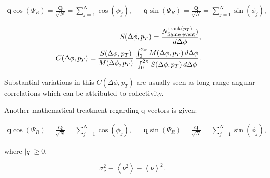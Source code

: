 

\begin{eqnarray}
  \textbf{q} \cos(\Psi_R) = \frac{\textbf{Q}}{\sqrt{N}} = \sum^N_{j=1} \cos(\phi_j), & &
  \textbf{q} \sin(\Psi_R) = \frac{\textbf{Q}}{\sqrt{N}} = \sum^N_{j=1} \sin(\phi_j), 
\end{eqnarray}

\begin{eqnarray}
  S(\Delta\phi,p_{T})=
  \frac{ N^{{\rm track}(p_{T}){\rm }}_{{\rm Same \; event}}) }{ d\Delta\phi}, & &
\label{eq31} \\
  C(\Delta\phi,p_{T}) =
          \frac{S(\Delta\phi,p_{T})}{M(\Delta\phi,p_{T})} \:
          \frac{\int_{0}^{2\pi} M(\Delta\phi,p_{T}) \, d\Delta\phi}{\int_{0}^{2\pi} S(\Delta\phi,p_{T}) \, d\Delta\phi}. & &
  \label{eq:def_corr_function}
\end{eqnarray}

Substantial variations in this $C(\Delta\phi,p_T)$ are usually seen as long-range angular correlations which can be attributed to collectivity.

Another mathematical treatment regarding q-vectors is given: 

\begin{eqnarray}
  \textbf{q} \cos(\Psi_R) = \frac{\textbf{Q}}{\sqrt{N}} = \sum^N_{j=1} \cos(\phi_j), & &
  \textbf{q} \sin(\Psi_R) = \frac{\textbf{Q}}{\sqrt{N}} = \sum^N_{j=1} \sin(\phi_j), 
\end{eqnarray}

where $|q| \geq 0$.

\begin{equation}
  \sigma_\nu^2 \equiv \left<\nu^2\right> - \left<\nu\right>^2.
\end{equation}

